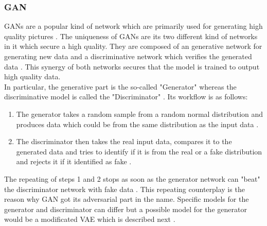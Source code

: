 \documentclass[MGS,Master,english]{twbook}%
\begin{document}
\subsubsection{\acl{GAN}}
\acp{GAN} are a popular kind of network which are primarily used for generating high quality pictures \cite{ml::book::developer}. The uniqueness of \acp{GAN} are its two different kind of networks in it which secure a high quality. They are composed of an generative network for generating new data and a discriminative network which verifies the generated data \cite{ml::book::developer}. This synergy of both networks secures that the model is trained to output high quality data. \\
In particular, the generative part is the so-called "Generator" whereas the discriminative model is called the "Discriminator" \cite{ml::book::developer}. Its workflow is as follows:
\begin{enumerate}
	\item The generator takes a random sample from a random normal distribution and produces data which could be from the same distribution as the input data \cite{ml::book::developer}.
	\item The discriminator then takes the real input data, compares it to the generated data and tries to identify if it is from the real or a fake distribution and rejects it if it identified as fake \cite{ml::book::developer}.
\end{enumerate} 
The repeating of steps 1 and 2 stops as soon as the generator network can "beat" the discriminator network with fake data \cite{ml::book::developer}. This repeating counterplay is the reason why GAN got its adversarial part in the name. Specific models for the generator and discriminator can differ but a possible model for the generator would be a modificated \ac{VAE} which is described next \cite{ml::book::nnProgrammingTF}.
\end{document}
